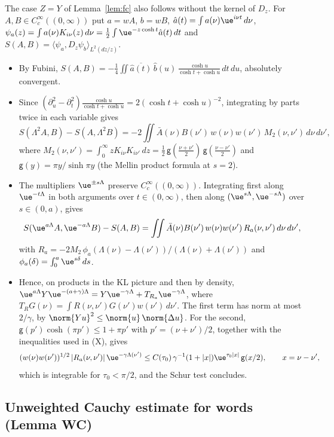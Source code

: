 \begin{remark}\label{rem:fc-y-alt}
The case $Z=Y$ of Lemma~\ref{lem:fc} also follows without the kernel of $D_z$. For $A,B\in C_c^\infty((0,\infty))$ put $a=wA$, $b=wB$, $\hat a(t)=\int a(\nu)\ue^{i\nu t}\,d\nu$, $\psi_a(z)=\int a(\nu)K_{i\nu}(z)\,d\nu=\tfrac12\int\ue^{-z\cosh t}\hat a(t)\,dt$ and $S(A,B)=\langle\psi_a,D_z\psi_b\rangle_{L^2(dz/z)}$.
\begin{itemize}
\item By Fubini, $S(A,B)=-\tfrac14\iint\overline{\hat a(t)}\,\hat b(u)\,\frac{\cosh u}{\cosh t+\cosh u}\,dt\,du$, absolutely convergent.
\item Since $(\partial_u^2-\partial_t^2)\frac{\cosh u}{\cosh t+\cosh u}=2(\cosh t+\cosh u)^{-2}$, integrating by parts twice in each variable gives
\[S(\Lambda^2A,B)-S(A,\Lambda^2B)=-2\iint\bar A(\nu)B(\nu')\,w(\nu)w(\nu')\,M_2(\nu,\nu')\,d\nu\,d\nu',\]
where $M_2(\nu,\nu')=\int_0^\infty zK_{i\nu}K_{i\nu'}\,dz=\tfrac12\,\mathsf g(\tfrac{\nu+\nu'}2)\,\mathsf g(\tfrac{\nu-\nu'}2)$ and $\mathsf g(y)=\pi y/\sinh\pi y$ (the Mellin product formula at $s=2$).
\item The multipliers $\ue^{\pm s\Lambda}$ preserve $C_c^\infty((0,\infty))$. Integrating first along $\ue^{-t\Lambda}$ in both arguments over $t\in(0,\infty)$, then along $(\ue^{s\Lambda},\ue^{-s\Lambda})$ over $s\in(0,a)$, gives
\[S(\ue^{a\Lambda}A,\ue^{-a\Lambda}B)-S(A,B)=\iint\bar A(\nu)B(\nu')\,w(\nu)w(\nu')\,R_a(\nu,\nu')\,d\nu\,d\nu',\]
with $R_a=-2M_2\,\phi_a(\Lambda(\nu)-\Lambda(\nu'))/(\Lambda(\nu)+\Lambda(\nu'))$ and $\phi_a(\delta)=\int_0^a\ue^{s\delta}\,ds$.
\item Hence, on products in the KL picture and then by density, $\ue^{a\Lambda}Y\ue^{-(a+\gamma)\Lambda}=Y\ue^{-\gamma\Lambda}+T_{R_a}\ue^{-\gamma\Lambda}$, where $T_RG(\nu)=\int R(\nu,\nu')G(\nu')w(\nu')\,d\nu'$. The first term has norm at most $2/\gamma$, by $\norm{Yu}^2\le\norm{u}\,\norm{\Delta u}$. For the second, $\mathsf g(p')\cosh(\pi p')\le1+\pi p'$ with $p'=(\nu+\nu')/2$, together with the inequalities used in (X), gives
\[(w(\nu)w(\nu'))^{1/2}\,|R_a(\nu,\nu')|\,\ue^{-\gamma\Lambda(\nu')}\le C(\tau_0)\,\gamma^{-1}(1+|x|)\ue^{\tau_0|x|}\,\mathsf g(x/2),\qquad x=\nu-\nu',\]
which is integrable for $\tau_0<\pi/2$, and the Schur test concludes.
\end{itemize}
\end{remark}

\subsection{Unweighted Cauchy estimate for words (Lemma WC)}\label{subsec:dd-wc}

